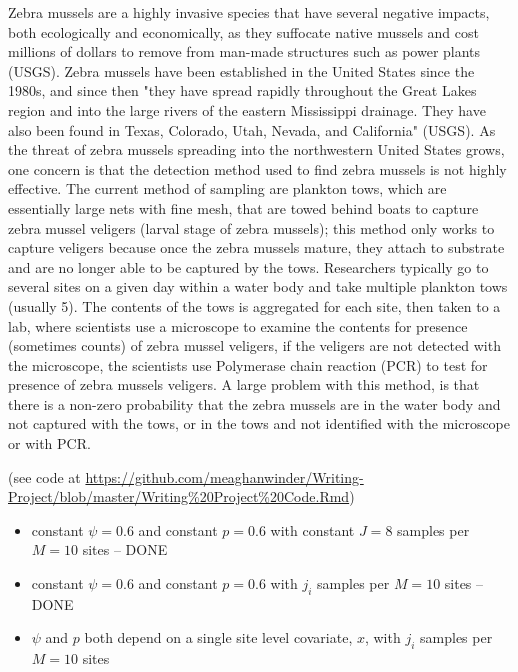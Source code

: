 \documentclass[12pt]{article}\usepackage[]{graphicx}\usepackage[]{color}
\begin{document}
Zebra mussels are a highly invasive species that have several negative impacts, both ecologically and economically, as they suffocate native mussels and cost millions of dollars to remove from man-made structures such as power plants (USGS). Zebra mussels have been established in the United States since the 1980s, and since then "they have spread rapidly throughout the Great Lakes region and into the large rivers of the eastern Mississippi drainage. They have also been found in Texas, Colorado, Utah, Nevada, and California" (USGS). As the threat of zebra mussels spreading into the northwestern United States grows, one concern is that the detection method used to find zebra mussels is not highly effective. The current method of sampling are plankton tows, which are essentially large nets with fine mesh, that are towed behind boats to capture zebra mussel veligers (larval stage of zebra mussels); this method only works to capture veligers because once the zebra mussels mature, they attach to substrate and are no longer able to be captured by the tows. Researchers typically go to several sites on a given day within a water body and take multiple plankton tows (usually 5). The contents of the tows is aggregated for each site, then taken to a lab, where scientists use a microscope to examine the contents for presence (sometimes counts) of zebra mussel veligers, if the veligers are not detected with the microscope, the scientists use Polymerase chain reaction (PCR) to  test for presence of zebra mussels veligers. A large problem with this method, is that there is a non-zero probability that the zebra mussels are in the water body and not captured with the tows, or in the tows and not identified with the microscope or with PCR. 

 (see code at \url{https://github.com/meaghanwinder/Writing-Project/blob/master/Writing%20Project%20Code.Rmd})

\begin{itemize}
\item constant $\psi = 0.6$ and constant $p = 0.6$ with constant $J = 8$ samples per $M = 10$ sites -- DONE
\item constant $\psi = 0.6$ and constant $p = 0.6$ with $j_i$ samples per $M = 10$ sites -- DONE
\item $\psi$ and $p$ both depend on a single site level covariate, $x$, with $j_i$ samples per $M = 10$ sites
\end{itemize}
\end{document}
